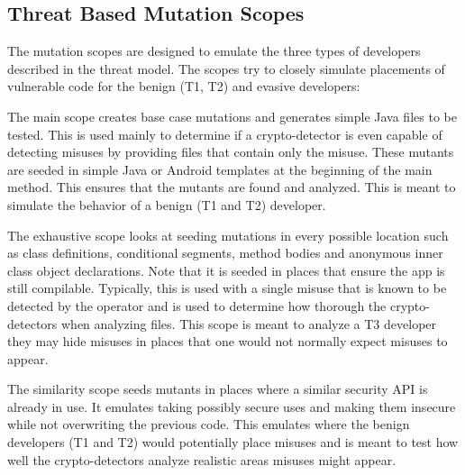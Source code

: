 \subsection{Threat Based Mutation Scopes}
\label{ch2:sec:scopes}

The mutation scopes are designed to emulate the three types of developers described in the threat model. The scopes try to closely simulate placements of vulnerable code for the benign (T1, T2) and evasive developers:

The main scope creates base case mutations and generates simple Java files to be tested. This is used mainly to determine if a crypto-detector is even capable of detecting misuses by providing files that contain only the misuse. These mutants are seeded in simple Java or Android templates at the beginning of the main method. This ensures that the mutants are found and analyzed. This is meant to simulate the behavior of a benign (T1 and T2) developer.

The exhaustive scope looks at seeding mutations in every possible location such as class definitions, conditional segments, method bodies and anonymous inner class object declarations. Note that it is seeded in places that ensure the app is still compilable. Typically, this is used with a single misuse that is known to be detected by the operator and is used to determine how thorough the crypto-detectors when analyzing files. This scope is meant to analyze a T3 developer they may hide misuses in places that one would not normally expect misuses to appear.

The similarity scope seeds mutants in places where a similar security API is already in use. It emulates taking possibly secure uses and making them insecure while not overwriting the previous code. This emulates where the benign developers (T1 and T2) would potentially place misuses and is meant to test how well the crypto-detectors analyze realistic areas misuses might appear. 
